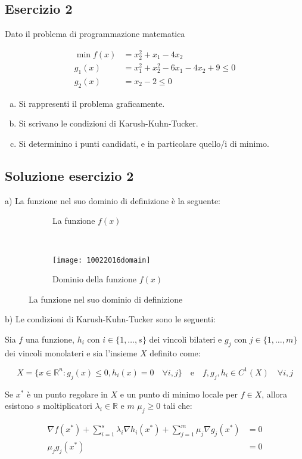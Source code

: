 \documentclass[\main/main.tex]{subfiles}
\begin{document}
\subsection{Esercizio 2}
Dato il problema di programmazione matematica

\begin{align*}
	\min f(x) & =x^2_2+x_1-4x_2                 \\
	g_1(x)    & =x^2_1+x^2_2-6x_1-4x_2+9 \leq 0 \\
	g_2(x)    & =x_2-2\leq0
\end{align*}

\begin{enumerate}[a)]
	\item Si rappresenti il problema graficamente.
	\item Si scrivano le condizioni di Karush-Kuhn-Tucker.
	\item Si determinino i punti candidati, e in particolare quello/i di minimo.
\end{enumerate}

\subsection{Soluzione esercizio 2}

a) La funzione nel suo dominio di definizione è la seguente:

\begin{figure}
	\begin{subfigure}{0.45\textwidth}
		\caption{La funzione $f(x)$}
	\end{subfigure}
	~
	\begin{subfigure}{0.45\textwidth}
		\texttt{[image: 10022016domain]}
		\caption{Dominio della funzione $f(x)$}
	\end{subfigure}
	\caption{La funzione nel suo dominio di definizione}
\end{figure}

b) Le condizioni di Karush-Kuhn-Tucker sono le seguenti:

\begin{theorem}
	Sia $f$ una funzione, $h_i \text{ con } i \in \{1, \ldots, s\}$ dei vincoli bilateri e $g_j \text{ con } j \in \{1, \ldots, m\}$ dei vincoli monolateri e sia l'insieme $X$ definito come:

	\[
		X  = \{x \in \mathbb{R}^n: g_j(x) \leq 0, h_i(x) = 0 \quad \forall i, j \} \quad \text{e} \quad f, g_j, h_i \in C^1(X) \quad \forall i,j
	\]

	Se $x^*$ è un punto regolare in $X$ e un punto di minimo locale per $f \in X$, allora esistono $s$ moltiplicatori $\lambda_i \in \mathbb{R}$ e $m$ $\mu_j \geq 0$ tali che:

	\begin{align*}
		\nabla f(x^*) + \sum_{i=1}^s \lambda_i \nabla h_i(x^*) + \sum_{j=1}^m \mu_j \nabla g_j(x^*) & = 0 \\
		\mu_j g_j(x^*)                                                                              & = 0
	\end{align*}
\end{theorem}
\end{document}
